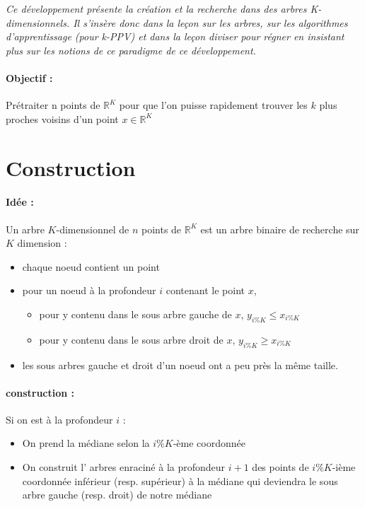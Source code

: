 
\textit{Ce développement présente la création et la recherche dans des arbres K-dimensionnels. Il s'insère donc dans la leçon sur les arbres, sur les algorithmes d'apprentissage (pour k-PPV) et dans la leçon diviser pour régner en insistant plus sur les notions de ce paradigme de ce développement.}

\paragraph{Objectif :} Prétraiter n points de $\mathbb R^K$ pour que l'on puisse rapidement trouver les $k$ plus proches voisins d'un point $x\in \mathbb R^K$

\section*{Construction}

\paragraph{Idée :} 
Un arbre $K$-dimensionnel de $n$ points de $\mathbb R^K$ est un arbre binaire de recherche sur $K$ dimension :
\begin{itemize}[label=$\star$]
	\item chaque noeud contient un point
	\item pour un noeud à la profondeur $i$ contenant le point $x$,\begin{itemize}[label=$\bullet$]
		\item pour y contenu dans le sous arbre gauche de $x$, $y_{i\%K} \leq x_{i\%K}$
		\item pour y contenu dans le sous arbre droit de $x$, $y_{i\%K} \geq x_{i\%K}$
	\end{itemize}
	\item les sous arbres gauche et droit d'un noeud ont a peu près la même taille.
\end{itemize}

\paragraph{construction :} Si on est à la profondeur $i$ :
\begin{itemize}
	\item On prend la médiane selon la $i\%K$-ème coordonnée
	\item On construit l' arbres enraciné à la profondeur $i+1$ des points de $i\%K$-ième coordonnée inférieur (resp. supérieur) à la médiane qui deviendra le sous arbre gauche (resp. droit) de notre médiane
\end{itemize}

